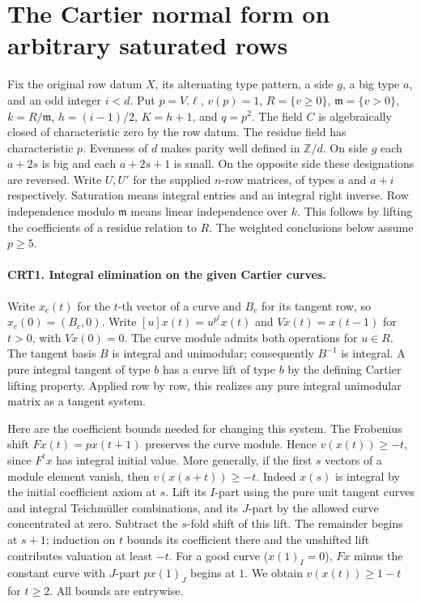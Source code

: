 \section{The Cartier normal form on arbitrary saturated rows}
\label{sec:cartier-normal-v59}

Fix the original row datum $X$, its alternating type pattern, a side
$g$, a big type $a$, and an odd integer $i<d$. Put $p=V.\ell$,
$v(p)=1$, $R=\{v\ge0\}$, $\mathfrak m=\{v>0\}$,
$k=R/\mathfrak m$, $h=(i-1)/2$, $K=h+1$, and $q=p^2$. The field
$C$ is algebraically closed of characteristic zero by the row datum.
The residue field has characteristic $p$. Evenness of $d$ makes parity
well defined in $\mathbb Z/d$. On side $g$ each $a+2s$ is big
and each $a+2s+1$ is small. On the opposite side these designations
are reversed. Write $U,U'$ for the supplied $n$-row matrices, of
types $a$ and $a+i$ respectively. Saturation means integral entries
and an integral right inverse. Row independence modulo $\mathfrak m$
means linear independence over $k$. This follows by lifting the
coefficients of a residue relation to $R$. The weighted conclusions
below assume $p\ge5$.

\paragraph{CRT1. Integral elimination on the given Cartier curves.}
Write $x_c(t)$ for the $t$-th vector of a curve and $B_c$ for its
tangent row, so $x_c(0)=(B_c,0)$. Write $[u]x(t)=u^{p^t}x(t)$ and
$Vx(t)=x(t-1)$ for $t>0$, with $Vx(0)=0$. The curve module admits both
operations for $u\in R$. The tangent basis $B$ is integral and
unimodular; consequently $B^{-1}$ is integral. A pure integral
tangent of type $b$ has a curve lift of type $b$ by the defining
Cartier lifting property. Applied row by row, this realizes any pure
integral unimodular matrix as a tangent system.

Here are the coefficient bounds needed for changing this system.
The Frobenius shift $Fx(t)=p x(t+1)$ preserves the curve module.
Hence $v(x(t))\ge-t$, since $F^tx$ has integral initial value.
More generally, if the first $s$ vectors of a module element vanish,
then $v(x(s+t))\ge-t$. Indeed $x(s)$ is integral by the initial
coefficient axiom at $s$. Lift its $I$-part using the pure unit
tangent curves and integral Teichm\"uller combinations, and its
$J$-part by the allowed curve concentrated at zero. Subtract the
$s$-fold shift of this lift. The remainder begins at $s+1$;
induction on $t$ bounds its coefficient there and the unshifted
lift contributes valuation at least $-t$. For a good curve
($x(1)_I=0$), $Fx$ minus the constant curve with $J$-part
$p x(1)_J$ begins at $1$. We obtain
$v(x(t))\ge1-t$ for $t\ge2$. All bounds are entrywise.

